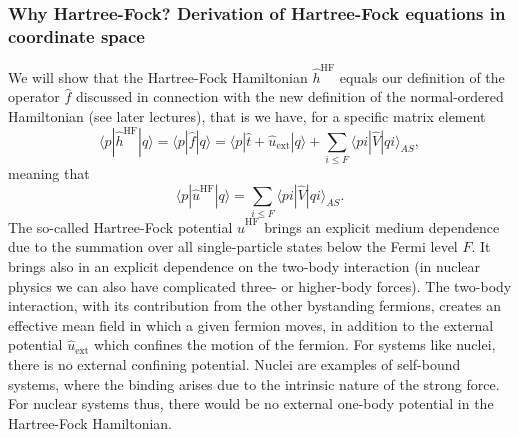 \documentclass{beamer}
\begin{document}
\begin{frame}
\frametitle{Why Hartree-Fock? Derivation of Hartree-Fock equations in coordinate space}

\begin{block}{}
We will show that the Hartree-Fock Hamiltonian $\hat{h}^{\mathrm{HF}}$ equals our definition of the operator $\hat{f}$ discussed in connection with the new definition of the normal-ordered Hamiltonian (see later lectures), that is we have, for a specific matrix element
\[
\langle p |\hat{h}^{\mathrm{HF}}| q \rangle =\langle p |\hat{f}| q \rangle=\langle p|\hat{t}+\hat{u}_{\mathrm{ext}}|q \rangle +\sum_{i\le F} \langle pi | \hat{V} | qi\rangle_{AS},
\]
meaning that
\[
\langle p|\hat{u}^{\mathrm{HF}}|q\rangle = \sum_{i\le F} \langle pi | \hat{V} | qi\rangle_{AS}.
\]
The so-called Hartree-Fock potential $\hat{u}^{\mathrm{HF}}$ brings an explicit medium dependence due to the summation over all single-particle states below the Fermi level $F$. It brings also in an explicit dependence on the two-body interaction (in nuclear physics we can also have complicated three- or higher-body forces). The two-body interaction, with its contribution from the other bystanding fermions, creates an effective mean field in which a given fermion moves, in addition to the external potential $\hat{u}_{\mathrm{ext}}$ which confines the motion of the fermion. For systems like nuclei, there is no external confining potential. Nuclei are examples of self-bound systems, where the binding arises due to the intrinsic nature of the strong force. For nuclear systems thus, there would be no external one-body potential in the Hartree-Fock Hamiltonian. 
\end{block}
\end{frame}
\end{document}
